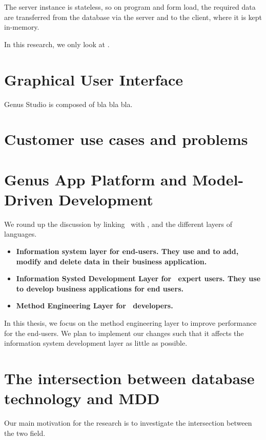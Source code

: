 The server instance is stateless, so on program and form load, the required data are transferred from the database via the server and to the client, where it is kept in-memory.

In this research, we only look at .

\section{Graphical User Interface}
\label{sec:Graphical User Interface}
Genus Studio is composed of bla bla bla.

\section{Customer use cases and problems}
\label{sec:Customer use cases and problems}


\section{Genus App Platform and Model-Driven Development}
\label{sec:Genus App Platform and Model-Driven Development}
We round up the discussion by linking \gap~with \mdd, and the different layers of languages.

\begin{itemize}
    \item \bf{Information system layer} for end-users. They use  and  to add, modify and delete data in their business application.
    \item \bf{Information Systed Development Layer} for \gap~expert users. They use  to develop business applications for end users.
    \item \bf{Method Engineering Layer} for \gap~developers. 
\end{itemize}

In this thesis, we focus on the method engineering layer to improve performance for the end-users. We plan to implement our changes such that it affects the information system development layer as little as possible.


\section{The intersection between database technology and MDD}
\label{sec:The intersection between database technology and MDD}
Our main motivation for the research is to investigate the intersection between the two field. 

